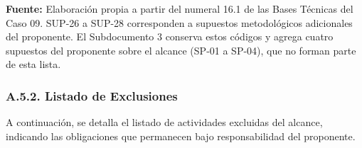 \documentclass[11pt]{article}
\begin{document}
\textbf{Fuente:} Elaboración propia a partir del numeral 16.1 de las Bases Técnicas del Caso 09. SUP-26 a SUP-28 corresponden a supuestos metodológicos adicionales del proponente. El Subdocumento 3 conserva estos códigos y agrega cuatro supuestos del proponente sobre el alcance (SP-01 a SP-04), que no forman parte de esta lista.

\subsubsection{A.5.2. Listado de Exclusiones}\label{a-5-2-listado-de-exclusiones}

A continuación, se detalla el listado de actividades excluidas del alcance, indicando las obligaciones que permanecen bajo responsabilidad del proponente.

\renewcommand{\thetable}{A.5.2}
\end{document}
